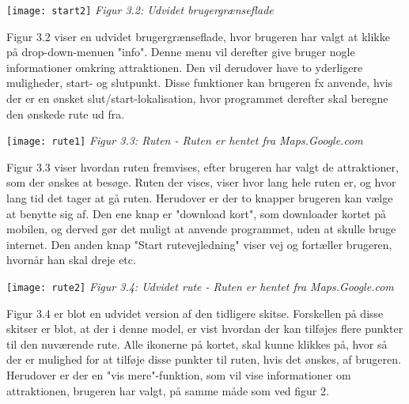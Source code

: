 \texttt{[image: start2]} \newline
\textit{Figur 3.2: Udvidet brugergrænseflade}\newline

Figur 3.2 viser en udvidet brugergrænseflade, hvor brugeren har valgt at klikke på drop-down-menuen "info". Denne menu vil derefter give bruger nogle informationer omkring attraktionen. Den vil derudover have to yderligere muligheder, start- og slutpunkt. Disse funktioner kan brugeren fx anvende, hvis der er en ønsket slut/start-lokalisation, hvor programmet derefter skal beregne den ønskede rute ud fra.\newline

\texttt{[image: rute1]} \newline
\textit{Figur 3.3: Ruten - Ruten er hentet fra Maps.Google.com}\newline

Figur 3.3 viser hvordan ruten fremvises, efter brugeren har valgt de attraktioner, som der ønskes at besøge. Ruten der vises, viser hvor lang hele ruten er, og hvor lang tid det tager at gå ruten. Herudover er der to knapper brugeren kan vælge at benytte sig af. Den ene knap er "download kort", som downloader kortet på mobilen, og derved gør det muligt at anvende programmet, uden at skulle bruge internet. Den anden knap "Start rutevejledning" viser vej og fortæller brugeren, hvornår han skal dreje etc. 


\texttt{[image: rute2]} \newline
\textit{Figur 3.4: Udvidet rute - Ruten er hentet fra Maps.Google.com}\newline

Figur 3.4 er blot en udvidet version af den tidligere skitse. Forskellen på disse skitser er blot, at der i denne model, er vist hvordan der kan tilføjes flere punkter til den nuværende rute. Alle ikonerne på kortet, skal kunne klikkes på, hvor så der er mulighed for at tilføje disse punkter til ruten, hvis det ønskes, af brugeren. Herudover er der en "vis mere"-funktion, som vil vise informationer om attraktionen, brugeren har valgt, på samme måde som ved figur 2. 

